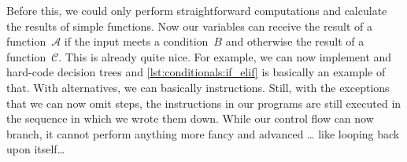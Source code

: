 Before this, we could only perform straightforward computations and calculate the results of simple functions.
Now our variables can receive the result of a function~${\mathcal{A}}$ if the input meets a condition~$B$ and otherwise the result of a function~${\mathcal{C}}$.
This is already quite nice.
For example, we can now implement and hard-code decision trees and \cref{lst:conditionals:if_elif} is basically an example of that.
With alternatives, we can basically  instructions.
Still, with the exceptions that we can now omit steps, the instructions in our programs are still executed in the sequence in which we wrote them down.
While our control flow can now branch, it cannot perform anything more fancy and advanced {\dots} like looping back upon itself\dots%
\endhsection%
%
\FloatBarrier%
\endhsection%
%
